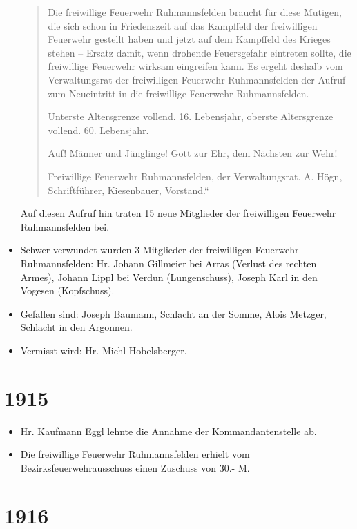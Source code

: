 \documentclass[12pt,a4paper]{book}
\begin{document}
\begin{itemize}
\begin{quote}
Die freiwillige Feuerwehr Ruhmannsfelden braucht für diese Mutigen, die sich
schon in Friedenszeit auf das Kampffeld der freiwilligen Feuerwehr gestellt
haben und jetzt auf dem Kampffeld des Krieges stehen – Ersatz damit, wenn
drohende Feuersgefahr eintreten sollte, die freiwillige Feuerwehr wirksam
eingreifen kann. Es ergeht deshalb vom Verwaltungsrat der freiwilligen Feuerwehr
Ruhmannsfelden der Aufruf zum Neueintritt in die freiwillige Feuerwehr
Ruhmannsfelden.

Unterste Altersgrenze vollend. 16. Lebensjahr, oberste Altersgrenze vollend. 60.
Lebensjahr.

Auf! Männer und Jünglinge! Gott zur Ehr, dem Nächsten zur Wehr!

Freiwillige Feuerwehr Ruhmannsfelden, der Verwaltungsrat. A. Högn,
Schriftführer, Kiesenbauer, Vorstand.“
\end{quote}

Auf diesen Aufruf hin traten 15 neue Mitglieder der freiwilligen Feuerwehr
Ruhmannsfelden bei.

\item Schwer verwundet wurden 3 Mitglieder der freiwilligen Feuerwehr
Ruhmannsfelden: Hr. Johann Gillmeier bei Arras (Verlust des rechten Armes),
Johann Lippl bei Verdun (Lungenschuss), Joseph Karl in den Vogesen (Kopfschuss).

\item Gefallen sind: Joseph Baumann, Schlacht an der Somme, Alois Metzger,
Schlacht in den Argonnen.

\item Vermisst wird: Hr. Michl Hobelsberger.
\end{itemize}

\section*{1915}

\begin{itemize}
\item Hr. Kaufmann Eggl lehnte die Annahme der Kommandantenstelle ab.

\item Die freiwillige Feuerwehr Ruhmannsfelden erhielt vom
Bezirksfeuerwehrausschuss einen Zuschuss von 30.- M.
\end{itemize}

\section*{1916}
\end{document}
